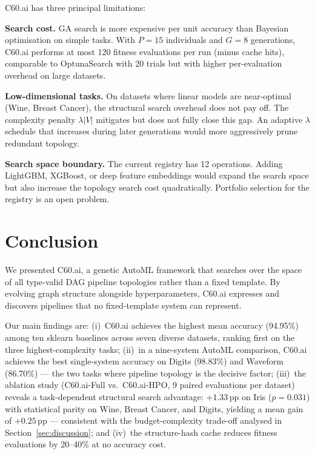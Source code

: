 \documentclass{article}
\theoremstyle{definition}
\theoremstyle{plain}
\theoremstyle{remark}
\begin{document}
C60.ai has three principal limitations:

\textbf{Search cost.}
GA search is more expensive per unit accuracy than Bayesian optimisation on
simple tasks.
With $P{=}15$ individuals and $G{=}8$ generations, C60.ai performs at most
120 fitness evaluations per run (minus cache hits), comparable to
OptunaSearch with 20 trials but with higher per-evaluation overhead on large
datasets.

\textbf{Low-dimensional tasks.}
On datasets where linear models are near-optimal (Wine, Breast Cancer), the
structural search overhead does not pay off.
The complexity penalty $\lambda|V|$ mitigates but does not fully close this
gap.
An adaptive $\lambda$ schedule that increases during later generations would
more aggressively prune redundant topology.

\textbf{Search space boundary.}
The current registry has 12 operations.
Adding LightGBM, XGBoost, or deep feature embeddings would expand the search
space but also increase the topology search cost quadratically.
Portfolio selection for the registry is an open problem.

\section{Conclusion}

We presented C60.ai, a genetic AutoML framework that searches over the space
of all type-valid DAG pipeline topologies rather than a fixed template.
By evolving graph structure alongside hyperparameters, C60.ai expresses and
discovers pipelines that no fixed-template system can represent.

Our main findings are:
(i)~C60.ai achieves the highest mean accuracy (94.95\%) among ten sklearn
baselines across seven diverse datasets, ranking first on the three
highest-complexity tasks;
(ii)~in a nine-system AutoML comparison, C60.ai achieves the best
single-system accuracy on Digits (98.83\%) and Waveform (86.70\%) — the
two tasks where pipeline topology is the decisive factor;
(iii)~the ablation study (C60.ai-Full vs.\ C60.ai-HPO, 9 paired evaluations
per dataset) reveals a task-dependent structural search advantage: +1.33\,pp
on Iris ($p{=}0.031$) with statistical parity on Wine, Breast Cancer, and
Digits, yielding a mean gain of $+0.25$\,pp — consistent with the
budget-complexity trade-off analysed in Section~\ref{sec:discussion};
and
(iv)~the structure-hash cache reduces fitness evaluations by 20--40\% at
no accuracy cost.
\end{document}
